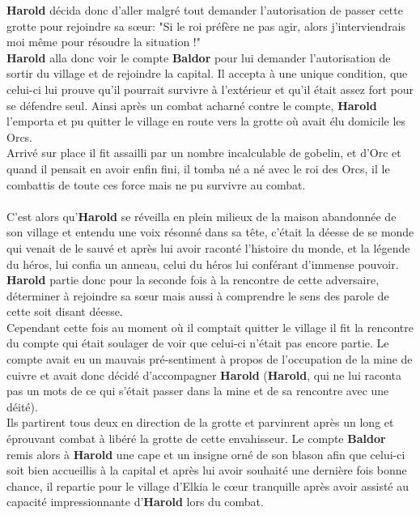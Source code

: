 \textbf{Harold} décida donc d'aller malgré tout demander l'autorisation de passer cette grotte pour rejoindre sa sœur: "Si le roi préfère ne pas agir, alors j'interviendrais moi même pour résoudre la situation !"\\
\textbf{Harold} alla donc voir le compte \textbf{Baldor} pour lui demander l'autorisation de sortir du village et de rejoindre la capital. Il accepta à une unique condition, que celui-ci lui prouve qu'il pourrait survivre à l'extérieur et qu'il était assez fort pour se défendre seul. Ainsi après un combat acharné contre le compte, \textbf{Harold} l'emporta et pu quitter le village en route vers la grotte où avait élu domicile les Orcs.\\
Arrivé sur place il fit assailli par un nombre incalculable de gobelin, et d'Orc et quand il pensait en avoir enfin fini, il tomba né a né avec le roi des Orcs, il le combattis de toute ces force mais ne pu survivre au combat.\\\\

C'est alors qu'\textbf{Harold} se réveilla en plein milieux de la maison abandonnée de son village et entendu une voix résonné dans sa tête, c'était la déesse de se monde qui venait de le sauvé et après lui avoir raconté l'histoire du monde, et la légende du héros, lui confia un anneau, celui du héros lui conférant d'immense pouvoir. \textbf{Harold} partie donc pour la seconde fois à la rencontre de cette adversaire, déterminer à rejoindre sa sœur mais aussi à comprendre le sens des parole de cette soit disant déesse.\\
Cependant cette fois au moment où il comptait quitter le village il fit la rencontre du compte qui était soulager de voir que celui-ci n'était pas encore partie. Le compte avait eu un mauvais pré-sentiment à propos de l'occupation de la mine de cuivre et avait donc décidé d'accompagner \textbf{Harold} (\textbf{Harold}, qui ne lui raconta pas un mots de ce qui s'était passer dans la mine et de sa rencontre avec une déité).\\
Ils partirent tous deux en direction de la grotte et parvinrent après un long et éprouvant combat à libéré la grotte de cette envahisseur. Le compte \textbf{Baldor} remis alors à \textbf{Harold} une cape et un insigne orné de son blason afin que celui-ci soit bien accueillis à la capital et après lui avoir souhaité une dernière fois bonne chance, il repartie pour le village d'Elkia le cœur tranquille après avoir assisté au capacité impressionnante d'\textbf{Harold} lors du combat.

